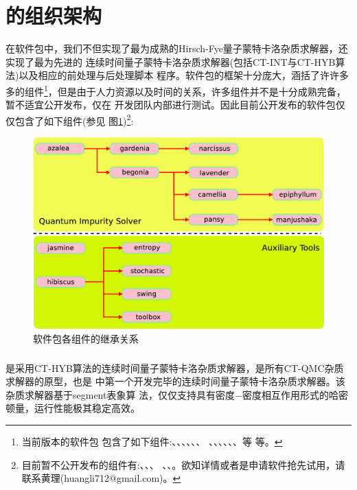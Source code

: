 \section{{\iqist}的组织架构}
\label{sec:framework}

在{\iqist}软件包中，我们不但实现了最为成熟的Hirsch-Fye量子蒙特卡洛杂质求解器，还实现了最为先进的
连续时间量子蒙特卡洛杂质求解器(包括CT-INT与CT-HYB算法)以及相应的前处理与后处理脚本
程序。{\iqist}软件包的框架十分庞大，涵括了许许多多的组件\footnote{当前版本的{\iqist}软件包
包含了如下组件:{\azalea}、{\gardenia}、{\narcissus}、{\begonia}、{\lavender}、{\camellia}、
{\epiphyllum}、{\pansy}、{\manjushaka}、{\sakura}、{\daisy}、{\jasmine}、{\hibiscus}等
等。}，但是由于人力资源以及时间的关系，许多组件并不是十分成熟完备，暂不适宜公开发布，仅在
开发团队内部进行测试。因此目前公开发布的{\iqist}软件包仅仅包含了如下组件(参见
图\ref{fig:history})\footnote{目前暂不公开发布的组件有:{\camellia}、{\epiphyllum}、{\pansy}、
{\manjushaka}、{\sakura}、{\daisy}。欲知详情或者是申请软件抢先试用，请联系黄理(huangli712@gmail.com)。}:

\begin{figure}
\centering
\includegraphics[scale=0.24]{figure/history.eps}
\caption{{\iqist}软件包各组件的继承关系\label{fig:history}}
\end{figure}

\subsubsection{{\azalea}}

{\azalea}是采用CT-HYB算法的连续时间量子蒙特卡洛杂质求解器，是所有CT-QMC杂质求解器的原型，也是
{\iqist}中第一个开发完毕的连续时间量子蒙特卡洛杂质求解器。该杂质求解器基于segment表象算
法\cite{werner:076405}，仅仅支持具有密度$-$密度相互作用形式的哈密顿量，运行性能极其稳定高效。

